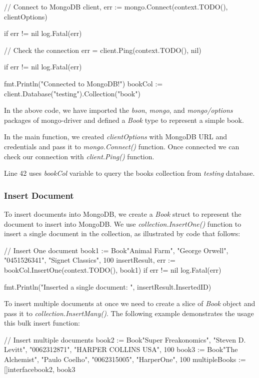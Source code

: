 \documentclass[12pt]{article}
\begin{document}
\begin{bashcode}
\begin{bashcode}
\begin{golangcode}
{  // Connect to MongoDB
  client, err := mongo.Connect(context.TODO(), clientOptions)

  if err != nil {
    log.Fatal(err)
  }

  // Check the connection
  err = client.Ping(context.TODO(), nil)

  if err != nil {
    log.Fatal(err)
  }

  fmt.Println("Connected to MongoDB!")
  bookCol := client.Database("testing").Collection("book")
}
\end{golangcode}

In the above code, we have imported the \emph{bson}, \emph{mongo}, and
\emph{mongo/options} packages of mongo-driver and defined a \emph{Book}
type to represent a simple book.

In the main function, we created \emph{clientOptions} with MongoDB URL
and credentials and pass it to \emph{mongo.Connect()} function. Once
connected we can check our connection with \emph{client.Ping()}
function.

Line 42 uses \emph{bookCol} variable to query the books collection from
\emph{testing} database.

\subsubsection{Insert Document}
To insert documents into MongoDB, we create a \emph{Book} struct to
represent the document to insert into MongoDB. We use
\emph{collection.InsertOne()} function to insert a single document in
the collection, as illustrated by code that follows:

\begin{golangcode}
// Insert One document
book1 := Book{"Animal Farm", "George Orwell", "0451526341", "Signet Classics", 100}
insertResult, err := bookCol.InsertOne(context.TODO(), book1)
if err != nil {
    log.Fatal(err)
}

fmt.Println("Inserted a single document: ", insertResult.InsertedID)
\end{golangcode}

To insert multiple documents at once we need to create a slice of
\emph{Book} object and pass it to \emph{collection.InsertMany()}.
The following example demonstrates the usage this bulk insert function:

\begin{golangcode}
// Insert multiple documents
book2 := Book{"Super Freakonomics", "Steven D. Levitt", "0062312871", "HARPER COLLINS USA", 100}
book3 := Book{"The Alchemist", "Paulo Coelho", "0062315005", "HarperOne", 100}
multipleBooks := []interface{}{book2, book3}


\end{golangcode}
\end{bashcode}
\end{bashcode}
\end{document}
